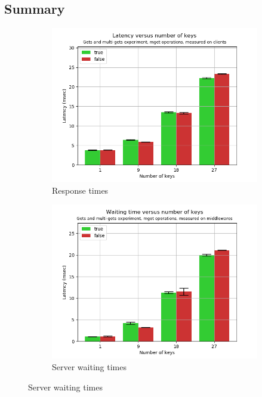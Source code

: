 \documentclass[11pt,a4paper]{article}
\begin{document}
\subsection{Summary} \label{sec:gmg-summary}
\begin{figure}[h]

\begin{subfigure}{.5\textwidth}
  \centering
  \includegraphics[width=1.0\linewidth ,trim={0 0 0 0},clip]{img/plot/extra-gmg-mget-lat_cli.png}
  \caption{Response times}
  \label{fig:extra-gmg-mget-lat_cli}
\end{subfigure}%
\begin{subfigure}{.5\textwidth}
  \centering
  \includegraphics[width=1.0\linewidth ,trim={0 0 0 0},clip]{img/plot/extra-gmg-mget-wtime_mw.png}
  \caption{Server waiting times}
  \label{fig:extra-gmg-mget-wtime_mw}
\end{subfigure}


\end{figure}
\end{document}

